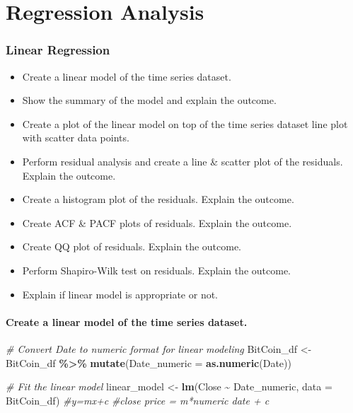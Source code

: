 \documentclass[
]{book}
\newenvironment{Shaded}{\begin{snugshade}}{\end{snugshade}}
\newcommand{\AttributeTok}[1]{\textcolor[rgb]{0.13,0.29,0.53}{#1}}
\newcommand{\CommentTok}[1]{\textcolor[rgb]{0.56,0.35,0.01}{\textit{#1}}}
\newcommand{\FunctionTok}[1]{\textcolor[rgb]{0.13,0.29,0.53}{\textbf{#1}}}
\newcommand{\NormalTok}[1]{#1}
\newcommand{\OtherTok}[1]{\textcolor[rgb]{0.56,0.35,0.01}{#1}}
\newcommand{\SpecialCharTok}[1]{\textcolor[rgb]{0.81,0.36,0.00}{\textbf{#1}}}
\providecommand{\tightlist}{%
  \setlength{\itemsep}{0pt}\setlength{\parskip}{0pt}}
\begin{document}
\chapter{Regression Analysis}\label{regression-analysis}

\subsection{Linear Regression}\label{linear-regression}

\begin{itemize}
\tightlist
\item
  Create a linear model of the time series dataset.
\item
  Show the summary of the model and explain the outcome.
\item
  Create a plot of the linear model on top of the time series dataset line plot with scatter data points.
\item
  Perform residual analysis and create a line \& scatter plot of the residuals. Explain the outcome.
\item
  Create a histogram plot of the residuals. Explain the outcome.
\item
  Create ACF \& PACF plots of residuals. Explain the outcome.
\item
  Create QQ plot of residuals. Explain the outcome.
\item
  Perform Shapiro-Wilk test on residuals. Explain the outcome.
\item
  Explain if linear model is appropriate or not.
\end{itemize}

\subsubsection{Create a linear model of the time series dataset.}\label{create-a-linear-model-of-the-time-series-dataset.}

\begin{Shaded}
\begin{Highlighting}[]
\CommentTok{\# Convert Date to numeric format for linear modeling}
\NormalTok{BitCoin\_df }\OtherTok{\textless{}{-}}\NormalTok{ BitCoin\_df }\SpecialCharTok{\%\textgreater{}\%}
\FunctionTok{mutate}\NormalTok{(}\AttributeTok{Date\_numeric =} \FunctionTok{as.numeric}\NormalTok{(Date))}

\CommentTok{\# Fit the linear model}
\NormalTok{linear\_model }\OtherTok{\textless{}{-}} \FunctionTok{lm}\NormalTok{(Close }\SpecialCharTok{\textasciitilde{}}\NormalTok{ Date\_numeric, }\AttributeTok{data =}\NormalTok{ BitCoin\_df)}
\CommentTok{\#y=mx+c}
\CommentTok{\#close price = m*numeric date + c}
\end{Highlighting}
\end{Shaded}
\end{document}
